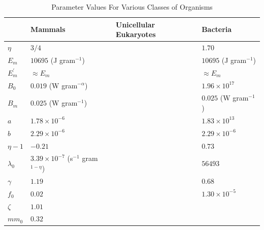 \documentclass[12pt,english]{article}
\begin{document}
\begin{spacing}{1.9}
%
%



%
\clearpage

\begin{table}[h]
\caption{Parameter Values For Various Classes of Organisms}
\label{parameter-values}
    \begin{center}
    \small
     \begin{tabular}{| p{1.2cm}| p{3.2cm} | p{2.6cm} | p{3.2cm} | }
     \hline
     & {\bf Mammals} & {\bf Unicellular Eukaryotes} & {\bf Bacteria} \\
     \hline
   $\eta$ & $3/4$ & & $1.70$ \\ 
   $E_{m}$ & $10695$ (J gram$^{-1}$) & & $10695$ (J gram$^{-1}$) \\ 
   $E_{m}^{\prime}$ & $\approx E_{m}$ & & $\approx E_{m}$ \\ 
   $B_{0}$ & $0.019$ (W gram$^{-\alpha}$) & & $1.96\times10^{17}$ \\
   $B_{m}$ & $0.025$ (W gram$^{-1}$)   & & $0.025$ (W gram$^{-1}$)\\
   $a$ & $1.78\times10^{-6}$ & & $1.83\times10^{13}$ \\ 
   $b$ & $2.29\times10^{-6}$ & & $2.29\times10^{-6}$ \\  
   $\eta-1$ & $-0.21$ & & $0.73$ \\ 
   $\lambda_{0}$ & $3.39\times10^{-7}$ (s$^{-1}$ gram$^{1-\eta}$) & & $56493$ \\ 
   $\gamma$ & $1.19$ & & $0.68$ \\ 
   $f_{0}$ & $0.02$ & & $1.30\times10^{-5}$ \\ 
   $\zeta$ & $1.01$ & & \\ 
   $mm_{0}$ & $0.32$ & & \\ 
   

\end{tabular}
\end{center}
\end{table}
\end{spacing}
\end{document}
